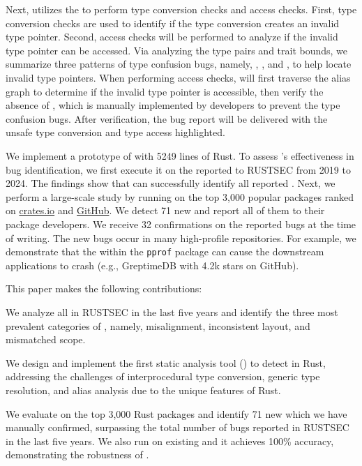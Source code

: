 Next, \bugdetector utilizes {the \pcg} to perform type conversion checks and access checks. First, type conversion checks are used to identify if the type conversion creates an invalid type pointer. Second, access checks will be performed to analyze if the invalid type pointer can be accessed. Via analyzing the type pairs and trait bounds, we summarize three patterns of type confusion bugs, namely, \bone, \btwo, and \bthree, to help locate invalid type pointers. When performing access checks, \bugdetector will first traverse the alias graph to determine if the invalid type pointer is accessible, then verify the absence of {\tc}, which is manually implemented by developers to prevent the type confusion bugs. After verification, the bug report will be delivered with the unsafe type conversion and type access highlighted.


We implement a prototype of \TN with 5249 lines of Rust. To assess \TN's effectiveness in bug identification, we first execute it on the \bugs reported to RUSTSEC from 2019 to 2024. The findings show that \TN can successfully identify all reported \bugs. Next, we perform a large-scale study by running \TN on the top 3,000 popular packages ranked on \url{crates.io} and \url{GitHub}. We detect 71 new \bugs and report all of them to their package developers. We receive {32} confirmations on the reported bugs at the time of writing. The new bugs occur in many high-profile repositories. For example, we demonstrate that the \bug within the \texttt{pprof} package can cause the downstream applications to crash (e.g., GreptimeDB with 4.2k stars on GitHub).  

\vspace{0.1in}
This paper makes the following contributions: 
\begin{packeditemize}
    \item We analyze all \bugs in RUSTSEC in the last five years and identify the three most prevalent categories of \bugs, namely, misalignment, inconsistent layout, and mismatched scope.
    \item We design and implement the first static analysis tool (\TN) to detect \bugs in Rust, {addressing the challenges of interprocedural type conversion, generic type resolution, and alias analysis} due to the unique features of Rust.
    \item We evaluate \TN on the top 3,000 Rust packages and identify {71} new \bugs which we have manually confirmed, surpassing the total number of bugs reported in RUSTSEC in the last five years. We also run \TN on existing \bugs and it achieves 100\% accuracy, demonstrating the robustness of \TN. 
\end{packeditemize}